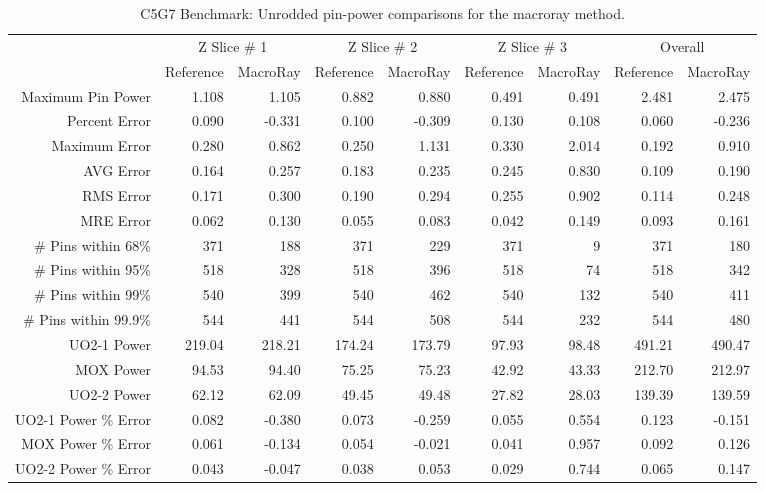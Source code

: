 {{{{        \begin{table}[htbp]
          \centering
          \caption{C5G7 Benchmark: Unrodded pin-power comparisons for the macroray method. \label{tab:MR:C5G7:Unrodded-MacroRay}}
          \scriptsize
          \begin{tabular}{rrrrrrrrr}\toprule
                                  & \multicolumn{2}{c}{Z Slice \# 1} & \multicolumn{2}{c}{Z Slice \# 2} & \multicolumn{2}{c}{Z Slice \# 3} & \multicolumn{2}{c}{Overall}\\
                                  & Reference & MacroRay & Reference & MacroRay & Reference & MacroRay & Reference & MacroRay\\\midrule
            Maximum Pin Power     & 1.108 & 1.105 & 0.882 & 0.880 & 0.491 & 0.491 & 2.481 & 2.475\\
            Percent Error         & 0.090 & -0.331 & 0.100 & -0.309 & 0.130 & 0.108 & 0.060 & -0.236\\\midrule
            Maximum Error         & 0.280 & 0.862 & 0.250 & 1.131 & 0.330 & 2.014 & 0.192 & 0.910\\
            AVG Error             & 0.164 & 0.257 & 0.183 & 0.235 & 0.245 & 0.830 & 0.109 & 0.190\\
            RMS Error             & 0.171 & 0.300 & 0.190 & 0.294 & 0.255 & 0.902 & 0.114 & 0.248\\
            MRE Error             & 0.062 & 0.130 & 0.055 & 0.083 & 0.042 & 0.149 & 0.093 & 0.161\\\midrule
            \# Pins within 68\%   & 371 & 188 & 371 & 229 & 371 & 9 & 371 & 180\\
            \# Pins within 95\%   & 518 & 328 & 518 & 396 & 518 & 74 & 518 & 342\\
            \# Pins within 99\%   & 540 & 399 & 540 & 462 & 540 & 132 & 540 & 411\\
            \# Pins within 99.9\% & 544 & 441 & 544 & 508 & 544 & 232 & 544 & 480\\\midrule
            UO2-1 Power           & 219.04 & 218.21 & 174.24 & 173.79 & 97.93 & 98.48 & 491.21 & 490.47\\
            MOX Power             & 94.53 & 94.40 & 75.25 & 75.23 & 42.92 & 43.33 & 212.70 & 212.97\\
            UO2-2 Power           & 62.12 & 62.09 & 49.45 & 49.48 & 27.82 & 28.03 & 139.39 & 139.59\\
            UO2-1 Power \% Error  & 0.082 & -0.380 & 0.073 & -0.259 & 0.055 & 0.554 & 0.123 & -0.151\\
            MOX Power \% Error    & 0.061 & -0.134 & 0.054 & -0.021 & 0.041 & 0.957 & 0.092 & 0.126\\
            UO2-2 Power \% Error  & 0.043 & -0.047 & 0.038 & 0.053 & 0.029 & 0.744 & 0.065 & 0.147\\\bottomrule
          \end{tabular}
        \end{table}

}}}}
